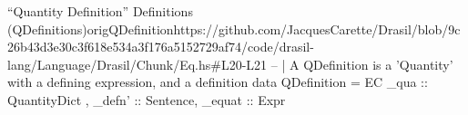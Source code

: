 \begin{haskell}{``Quantity Definition'' Definitions (QDefinitions)}{origQDefinition}{https://github.com/JacquesCarette/Drasil/blob/9c26b43d3e30c3f618e534a3f176a5152729af74/code/drasil-lang/Language/Drasil/Chunk/Eq.hs\#L20-L21}
-- | A QDefinition is a 'Quantity' with a defining expression, and a definition
data QDefinition = EC { _qua :: QuantityDict , _defn' :: Sentence, _equat :: Expr }
\end{haskell}
